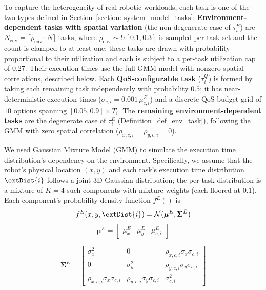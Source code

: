    To capture the heterogeneity of real robotic workloads, each task is one of the two types defined in Section~\ref{section: system_model_tasks}:
    \textbf{Environment-dependent tasks with spatial variation} (the non-degenerate case of $\tau^E_i$) are $N_{\text{env}} = \lceil \rho_{\text{env}} \cdot N \rceil$ tasks, where $\rho_{\text{env}} \sim U[0.1, 0.3]$ is sampled per task set and the count is clamped to at least one; these tasks are drawn with probability proportional to their utilization and each is subject to a per-task utilization cap of $0.27$. Their execution times use the full GMM model with nonzero spatial correlations, described below.
    Each \textbf{QoS-configurable task} ($\tau^Q_i$) is formed by taking each remaining task independently with probability $0.5$; it has near-deterministic execution times ($\sigma_{c,i} = 0.001\,\mu^E_{c,i}$) and a discrete QoS-budget grid of $10$ options spanning $[0.05, 0.9] \times T_i$.
    The \textbf{remaining environment-dependent tasks} are the degenerate case of $\tau^E_i$ (Definition~\ref{def_env_task}), following the GMM with zero spatial correlation ($\rho_{x,c,i} = \rho_{y,c,i} = 0$).

    We used Gaussian Mixture Model (GMM) to simulate the execution time distribution's dependency on the environment. Specifically, we assume that the robot's physical location $(x, y)$ and each task's execution time distribution $\extDist{i}$ follows a joint 3D Gaussian distribution; the per-task distribution is a mixture of $K{=}4$ such components with mixture weights (each floored at $0.1$). Each component's probability density function $f^{E}()$ is
    \begin{equation}
        f^{E}(x, y, \extDist{i}) =\mathcal{N}(\boldsymbol{\mu}^E, \boldsymbol{\Sigma}^E)
        \label{eq: pdf_gmm}
    \end{equation}
    \begin{equation}
        \boldsymbol{\mu}^E = \begin{bmatrix}
            \mu^E_x & \mu^E_y & \mu^E_{c,i}
        \end{bmatrix}
    \end{equation}

\begin{equation}
    \boldsymbol{\Sigma}^E =
    \begin{bmatrix}
        \sigma_x^2 & 0 & \rho_{x,c,i} \sigma_x \sigma_{c,i} \\
        0 & \sigma_y^2 & \rho_{y,c,i} \sigma_y \sigma_{c,i} \\
        \rho_{x,c,i} \sigma_x \sigma_{c,i} & \rho_{y,c,i} \sigma_y \sigma_{c,i} & \sigma_{c,i}^2
    \end{bmatrix}
\end{equation}

